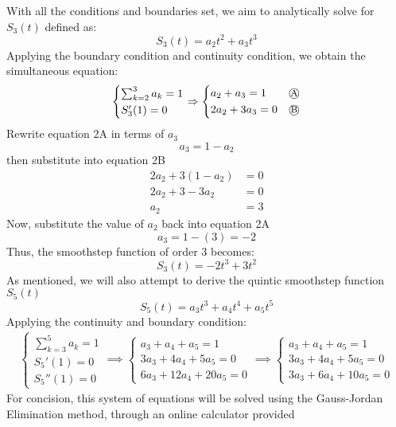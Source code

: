 With all the conditions and boundaries set, we aim to analytically solve for $S_3(t)$ defined as:
\[S_3(t)=a_2t^2+a_3t^3\]
Applying the boundary condition and continuity condition, we obtain the simultaneous equation:
\begin{align}
    \begin{cases*}
        \sum_{k=2}^{3}a_k=1\\
        S_3'(1)=0
    \end{cases*}
    \implies
    \begin{cases*}
        a_2+a_3=1\quad\quad \text{\textcircled{\footnotesize{A}}} \\
        2a_2+3a_3=0\quad \text{\textcircled{\footnotesize{B}}}
    \end{cases*}
\end{align}
Rewrite equation 2A in terms of $a_3$
\[a_3=1-a_2\]
then substitute into equation 2B
\begin{align*}
    2a_2+3(1-a_2)&=0\\
    2a_2+3-3a_2&=0\\
    a_2&=3
\end{align*}
Now, substitute the value of $a_2$ back into equation 2A
\[a_3=1-(3)=-2\]
Thus, the smoothstep function of order 3 becomes:
\begin{equation} \label{eq:3}
    S_3 (t)=-2t^3+3t^2
\end{equation}
As mentioned, we will also attempt to derive the quintic smoothstep function $S_5(t)$
\[S_5(t)=a_3t^3+a_4t^4+a_5t^5\]
Applying the continuity and boundary condition:
\begin{align} \label{eq:4}
    \begin{cases*}
        \sum_{k=3}^{5}a_k=1 \\
        S_5'(1)=0 \\
        S_5''(1)=0
    \end{cases*}
    \implies
    \begin{cases*}
        a_3+a_4+a_5=1\\
        3a_3+4a_4+5a_5=0\\
        6a_3+12a_4+20a_5=0
    \end{cases*}
    \implies
    \begin{cases*}
        a_3+a_4+a_5=1\\
        3a_3+4a_4+5a_5=0\\
        3a_3+6a_4+10a_5=0
    \end{cases*}
\end{align}
For concision, this system of equations will be solved using the Gauss-Jordan Elimination method, through an online calculator provided 
